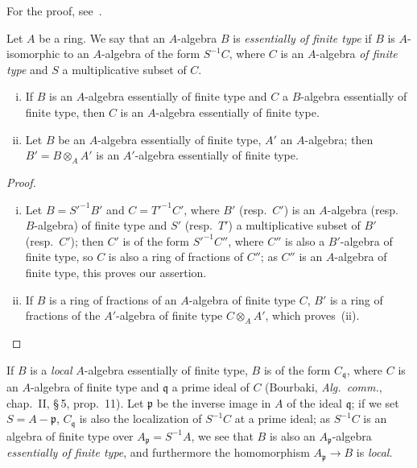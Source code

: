 For the proof, see~.

\begin{env}[1.3.8]
\label{IV.1.3.8}
Let $A$ be a ring. We say that an $A$-algebra $B$ is \emph{essentially of finite type}
if $B$ is $A$-isomorphic to an $A$-algebra of the form $S^{-1}C$, where $C$ is an $A$-algebra \emph{of
finite type} and $S$ a multiplicative subset of $C$.
\end{env}

\begin{proposition}[1.3.9]
\label{IV.1.3.9}
\medskip\noindent
\begin{enumerate}[(i)]
  \item If $B$ is an $A$-algebra essentially of finite type and $C$
    a $B$-algebra essentially of finite type, then $C$ is an $A$-algebra essentially of finite type.
  \item Let $B$ be an $A$-algebra essentially of finite type, $A'$ an $A$-algebra; then $B'=B\otimes_A A'$
    is an $A'$-algebra essentially of finite type.
\end{enumerate}
\end{proposition}

\begin{proof}
\begin{enumerate}[(i)]
  \item Let $B=S'^{-1}B'$ and $C=T'^{-1}C'$, where $B'$ (resp.\ $C'$) is an $A$-algebra (resp.\
    $B$-algebra) of finite type and $S'$ (resp.\ $T'$) a multiplicative subset of $B'$ (resp.\ $C'$);
    then $C'$ is of the form $S'^{-1}C''$, where $C''$ is also a $B'$-algebra of finite type, so $C$ is also
    a ring of fractions of $C''$; as $C''$ is an $A$-algebra of finite type, this proves
    our assertion.
  \item If $B$ is a ring of fractions of an $A$-algebra of finite type $C$, $B'$ is a ring
    of fractions of the $A'$-algebra of finite type $C\otimes_A A'$, which proves~(ii).
\end{enumerate}
\end{proof}

\begin{env}[1.3.10]
\label{IV.1.3.10}
If $B$ is a \emph{local} $A$-algebra essentially of finite type, $B$ is of the
form $C_{\mathfrak{q}}$, where $C$ is an $A$-algebra of finite type and $\mathfrak{q}$ a prime ideal of $C$ (Bourbaki,
\emph{Alg.\ comm.}, chap.~II, \S\,5, prop.~11). Let $\mathfrak{p}$ be the inverse image in $A$ of the ideal $\mathfrak{q}$; if we set
$S=A-\mathfrak{p}$, $C_{\mathfrak{q}}$ is also the localization of $S^{-1}C$ at a prime ideal; as $S^{-1}C$
is an algebra of finite type over $A_{\mathfrak{p}}=S^{-1}A$, we see that $B$ is also an $A_{\mathfrak{p}}$-algebra \emph{essentially
of finite type}, and furthermore the homomorphism $A_{\mathfrak{p}}\to B$ is \emph{local}.
\end{env}

